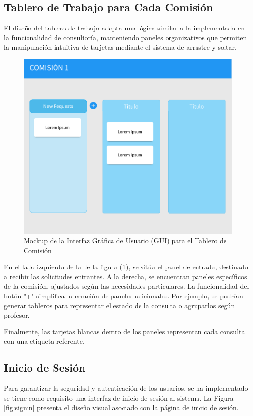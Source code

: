 \subsection{Tablero de Trabajo para Cada Comisión}

El diseño del tablero de trabajo adopta una lógica similar a la implementada en la funcionalidad de consultoría, manteniendo paneles organizativos que permiten la manipulación intuitiva de tarjetas mediante el sistema de arrastre y soltar.


\begin{figure}[H]
\centering
\includegraphics[width=1\linewidth]{fig/board.png}
\caption{Mockup de la Interfaz Gráfica de Usuario (GUI) para el Tablero de Comisión}
\label{fig:board}
\end{figure}


En el lado izquierdo de la de la figura (\ref{fig:board}), se sitúa el panel de entrada, destinado a recibir las solicitudes entrantes. A la derecha, se encuentran paneles específicos de la comisión, ajustados según las necesidades particulares. La funcionalidad del botón "+" simplifica la creación de paneles adicionales. Por ejemplo, se podrían generar tableros para representar el estado de la consulta o agruparlos según profesor.

Finalmente, las tarjetas blancas dentro de los paneles representan cada consulta con una etiqueta referente.


\subsection{Inicio de Sesión}
Para garantizar la seguridad y autenticación de los usuarios, se ha implementado se tiene como requisito una interfaz de inicio de sesión al sistema. La Figura \ref{fig:signin} presenta el diseño visual asociado con la página de inicio de sesión.

